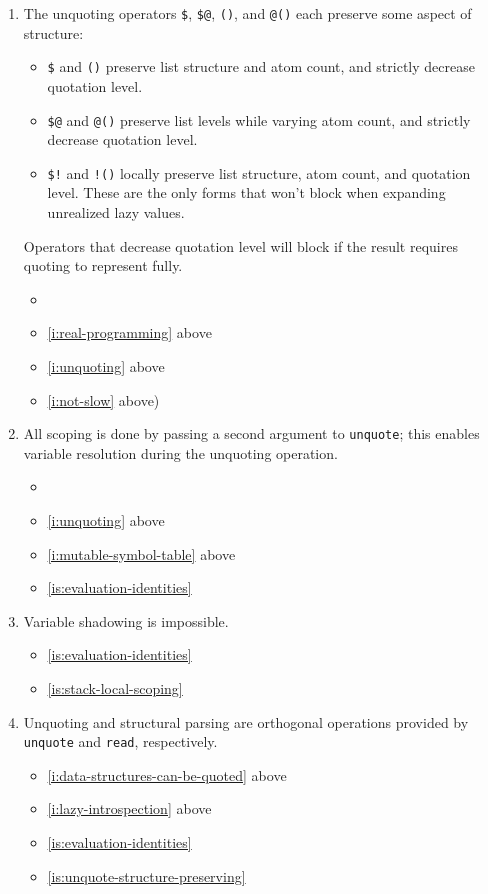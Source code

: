 \documentclass{report}
\makeatletter
\newcommand*{\Label}[2]{%
  \@bsphack
  \begingroup
    \label{#1-original}%
    \def\@currentlabel{#2 [\ref{#1-original}]}%
    \label{#1}%
  \endgroup
  \@esphack
}
\makeatother
\begin{document}
\begin{enumerate}
\item{}\Label{is:unquote-structure-preserving}{unquote-structure}
  The unquoting operators \verb|$|, \verb|$@|, \verb|()|, and \verb|@()|
  each preserve some aspect of structure:
\begin{itemize}
\item{}
  \verb|$| and \verb|()| preserve list structure and atom count, and
  strictly decrease quotation level.
\item{}
  \verb|$@| and \verb|@()| preserve list levels while varying atom
  count, and strictly decrease quotation level.
\item{}
  \verb|$!| and \verb|!()| locally preserve list structure, atom count,
  and quotation level. These are the only forms that won't block when
  expanding unrealized lazy values.
\end{itemize}
  Operators that decrease quotation level will block if the result requires
  quoting to represent fully.
\begin{itemize}
\item \initial
\item \ref{i:real-programming} above
\item \ref{i:unquoting} above
\item \ref{i:not-slow} above)
\end{itemize}
\item{}\Label{is:stack-local-scoping}{stackscope}
  All scoping is done by passing a second argument to {\tt unquote}; this
  enables variable resolution during the unquoting operation.
\begin{itemize}
\item \initial
\item \ref{i:unquoting} above
\item \ref{i:mutable-symbol-table} above
\item \ref{is:evaluation-identities}
\end{itemize}
\item{}\Label{is:no-variable-shadowing}{noshadow}
  Variable shadowing is impossible.
\begin{itemize}
\item \ref{is:evaluation-identities}
\item \ref{is:stack-local-scoping}
\end{itemize}
\item{}\Label{is:unquoting-vs-parsing}{unquote-parse}
  Unquoting and structural parsing are orthogonal operations provided by
  {\tt unquote} and {\tt read}, respectively.
\begin{itemize}
\item \ref{i:data-structures-can-be-quoted} above
\item \ref{i:lazy-introspection} above
\item \ref{is:evaluation-identities}
\item \ref{is:unquote-structure-preserving}
\end{itemize}


\end{enumerate}
\end{document}
